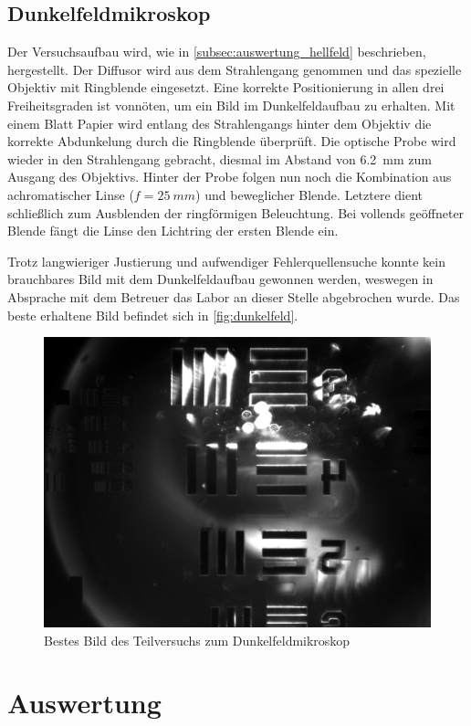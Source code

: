 \documentclass[ngerman]{scrartcl}
\begin{document}
\subsection{Dunkelfeldmikroskop}
\label{subsec:durchfuehrung_dunkelfeld}

Der Versuchsaufbau wird, wie in \autoref{subsec:auswertung_hellfeld} beschrieben, hergestellt. Der Diffusor wird aus dem Strahlengang genommen und das spezielle Objektiv mit Ringblende eingesetzt. Eine korrekte Positionierung in allen drei Freiheitsgraden ist vonnöten, um ein Bild im Dunkelfeldaufbau zu erhalten. Mit einem Blatt Papier wird entlang des Strahlengangs hinter dem Objektiv die korrekte Abdunkelung durch die Ringblende überprüft. Die optische Probe wird wieder in den Strahlengang gebracht, diesmal im Abstand von \SI{6.2}{mm} zum Ausgang des Objektivs. Hinter der Probe folgen nun noch die Kombination aus achromatischer Linse
($f = \SI{25}{mm}$) und beweglicher Blende. Letztere dient schließlich zum Ausblenden der ringförmigen Beleuchtung. Bei vollends geöffneter Blende fängt die Linse den Lichtring der ersten Blende ein.

Trotz langwieriger Justierung und aufwendiger Fehlerquellensuche konnte kein brauchbares Bild mit dem Dunkelfeldaufbau gewonnen werden, weswegen in Absprache mit dem Betreuer das Labor an dieser Stelle abgebrochen wurde. Das beste erhaltene Bild befindet sich in \autoref{fig:dunkelfeld}.
%
\begin{figure}[H]
    \centering
    \begin{samepage}
        \includegraphics[width=0.6\linewidth]{fig/Versuch4/dunkelfeld_test.jpg}
        \caption[Dunkelfeld]{Bestes Bild des Teilversuchs zum Dunkelfeldmikroskop}
        \label{fig:dunkelfeld}
    \end{samepage}
\end{figure}



\section{Auswertung}
\label{sec:auswertung}
\end{document}
